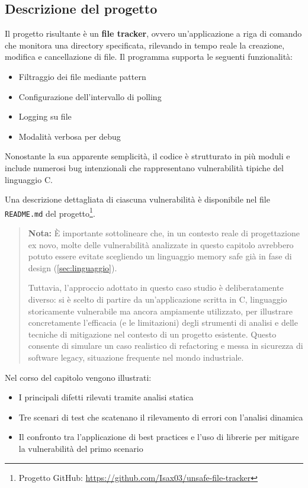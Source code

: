 \subsection*{Descrizione del progetto}

Il progetto risultante è un \textbf{file tracker}, ovvero un'applicazione a riga
di comando che monitora una directory specificata, rilevando in tempo reale la
creazione, modifica e cancellazione di file. Il programma supporta le seguenti
funzionalità:
\begin{itemize}
  \item Filtraggio dei file mediante pattern

  \item Configurazione dell'intervallo di polling

  \item Logging su file

  \item Modalità verbosa per debug
\end{itemize}

Nonostante la sua apparente semplicità, il codice è strutturato in più moduli e include
numerosi bug intenzionali che rappresentano vulnerabilità tipiche del linguaggio
C.

Una descrizione dettagliata di ciascuna vulnerabilità è disponibile nel file \texttt{README.md}
del progetto\footnote{Progetto GitHub: \url{https://github.com/Isax03/unsafe-file-tracker}}.

\begin{quote}
  \textbf{Nota:} È importante sottolineare che, in un contesto reale di progettazione
  ex novo, molte delle vulnerabilità analizzate in questo capitolo avrebbero
  potuto essere evitate scegliendo un linguaggio memory safe già in fase di
  design (\autoref{sec:linguaggio}).

  Tuttavia, l'approccio adottato in questo caso studio è deliberatamente diverso:
  si è scelto di partire da un'applicazione scritta in C, linguaggio storicamente
  vulnerabile ma ancora ampiamente utilizzato, per illustrare concretamente l'efficacia
  (e le limitazioni) degli strumenti di analisi e delle tecniche di mitigazione
  nel contesto di un progetto esistente. Questo consente di simulare un caso realistico
  di refactoring e messa in sicurezza di software legacy, situazione frequente
  nel mondo industriale.
\end{quote}

Nel corso del capitolo vengono illustrati:
\begin{itemize}
  \item I principali difetti rilevati tramite analisi statica

  \item Tre scenari di test che scatenano il rilevamento di errori con l'analisi
    dinamica

  \item Il confronto tra l'applicazione di best practices e l'uso di librerie per
    mitigare la vulnerabilità del primo scenario
\end{itemize}

